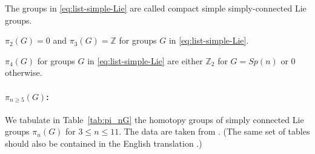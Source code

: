 \documentclass[12pt]{article}
\numberwithin{equation}{section}
\numberwithin{figure}{section}
\theoremstyle{remark}
\def\bZ{\mathbb{Z}}
\begin{document}
The groups in \eqref{eq:list-simple-Lie} are called compact 
simple simply-connected Lie groups.

\begin{fact}
$\pi_2(G)=0$ and $\pi_3(G)=\bZ$ for groups $G$ in \eqref{eq:list-simple-Lie}.
\end{fact}

\begin{fact}
$\pi_4(G)$ for groups $G$ in \eqref{eq:list-simple-Lie} are 
either $\bZ_2$ for $G=Sp(n)$ or $0$ otherwise.
\end{fact}

\paragraph{$\pi_{n\ge 5}(G)$:}

We tabulate in Table~\ref{tab:pi_nG}
the homotopy groups of simply connected Lie groups $\pi_{n}(G)$ 
for  $3\le n\le 11$.
The data are taken from \cite[付録, 公式 7, VII]{Jiten}.
(The same set of tables should also be contained in the English translation \cite{EDM}.)
\end{document}
